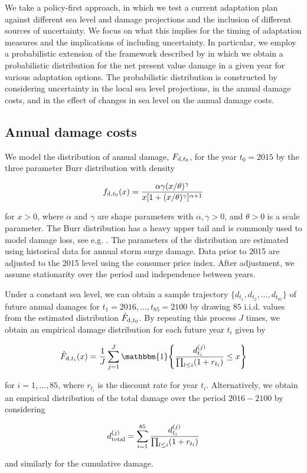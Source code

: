 \documentclass[draft,linenumbers]{agujournal}
\begin{document}
We take a policy-first approach, in which we test a current adaptation plan against different sea level and damage projections and the inclusion of different sources of uncertainty. We focus on what this implies for the timing of adaptation measures and the implications of including uncertainty. In particular, we employ a probabilistic extension of the framework described by \citep{Fankhauser&1999} in which we obtain a probabilistic distribution for the net present value damage in a given year for various adaptation options. The probabilistic distribution is constructed by considering uncertainty in the local sea level projections, in the annual damage costs, and in the effect of changes in sea level on the annual damage costs. 

\subsection{Annual damage costs} 

We model the distribution of annual damage, $F_{\textup{d}, t_0}$, for the year $t_0 = 2015$ by the three parameter Burr distribution \citep{Burr1942} with density
\begin{linenomath*}
  \begin{equation}\label{eq:Burr}
  f_{\textup{d}, t_0} (x) = \frac{\alpha \gamma (x/ \theta)^{\gamma}}{x [ 1 + (x/ \theta)^{\gamma}]^{\alpha + 1}}
  \end{equation}
\end{linenomath*}
for $x > 0$, where $\alpha$ and $\gamma$ are shape parameters with $\alpha, \gamma > 0$, and $\theta >0$ is a scale parameter. The Burr distribution has a heavy upper tail and is commonly used to model damage loss, see e.g. \cite{Klugman&2012}. The parameters of the distribution are estimated using historical data for annual storm surge damage. Data prior to 2015 are adjusted to the 2015 level using the consumer price index. After adjustment, we assume stationarity over the period and independence between years.

Under a constant sea level, we can obtain a sample trajectory $\{d_{t_1}, d_{t_2}, \ldots, d_{t_{85}}\}$ of future annual damages for $t_1 = 2016, \ldots, t_{85} = 2100$ by drawing $85$ i.i.d. values from the estimated distribution $\hat{F}_{\textup{d}, t_0}$.  By repeating this process $J$ times, we obtain an empirical damage distribution for each future year $t_i$ given by
\begin{linenomath*}
  \[
  \hat{F}_{\textup{d}, t_i} (x) = \frac{1}{J} \sum_{j=1}^J \mathbbm{1}\Bigg\{ \frac{d_{t_i}^{(j)}}{\prod_{l \leq i} (1 + r_{t_l}) } \leq x \Bigg\}
  \]
\end{linenomath*}
for $i = 1, \ldots, 85$, where $r_{t_i}$ is the discount rate for year $t_i$. Alternatively, we obtain an empirical distribution of the total damage over the period $2016-2100$ by considering
\begin{linenomath*}
  \[
  d_{\textup{total}}^{(j)} = \sum_{i=1}^{85} \frac{d_{t_i}^{(j)}}{\prod_{l \leq i} (1 + r_{t_l})}
  \]
\end{linenomath*}
and similarly for the cumulative damage.  
\end{document}
